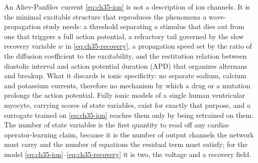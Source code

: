 An Aliev-Panfilov current \eqref{eq:ch35-ion} is not a description of ion
channels. It is the minimal excitable structure that reproduces the phenomena a
wave-propagation study needs: a threshold separating a stimulus that dies out
from one that triggers a full action potential, a refractory tail governed by
the slow recovery variable $w$ in \eqref{eq:ch35-recovery}, a propagation speed
set by the ratio of the diffusion coefficient to the excitability, and the
restitution relation between diastolic interval and action potential duration
(APD) that organizes alternans and
breakup. What it discards is ionic specificity: no separate sodium, calcium and
potassium currents, therefore no mechanism by which a drug or a mutation
prolongs the action potential. Fully ionic models of a single human ventricular
myocyte, carrying scores of state variables, exist for exactly that purpose,
and a surrogate trained on \eqref{eq:ch35-ion} reaches them only by being
retrained on them. The number of state variables is the first quantity to read
off any cardiac operator-learning claim, because it is the number of output
channels the network must carry and the number of equations the residual term
must satisfy; for the model \eqref{eq:ch35-ion}--\eqref{eq:ch35-recovery} it is
two, the voltage and a recovery field.

